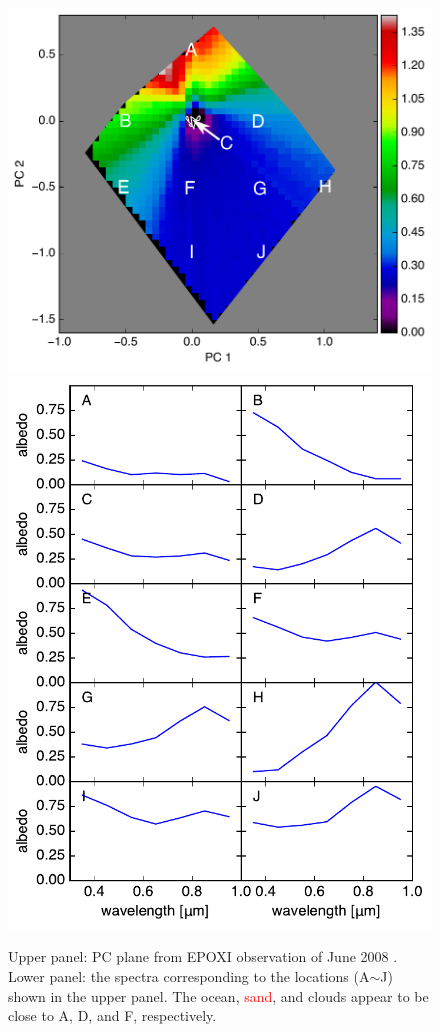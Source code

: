 \documentclass[iop,numberedappendix,apj]{emulateapj}
\def\edit#1{\textcolor{red}{#1}}
\begin{document}
\begin{figure}[tbh!]
    \begin{center}
	\includegraphics[width=\hsize]{raddata_2_PCplane_noreg_labels.pdf}
	\includegraphics[width=\hsize]{raddata_2_norm_spectra.pdf}
    \end{center}
    \caption{Upper panel: PC plane from EPOXI observation of June 2008 \citep{Livengood2011}. Lower panel: the spectra corresponding to the locations (A$\sim$J) shown in the upper panel. The ocean, \edit{sand}, and clouds appear to be close to A, D, and F, respectively. }
\label{fig:EPOXI}
\end{figure}
\end{document}
